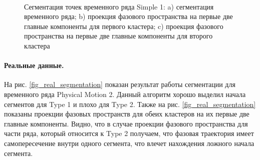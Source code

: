 \begin{figure}[h!t]\center
{}
\\
\caption{Сегментация точек временного ряда Simple 1: 
a) сегментация временного ряда; b) проекция фазового пространства на первые две главные компоненты для первого кластера; c) проекция фазового пространства на первые две главные компоненты для второго кластера}
\label{fig_simple_segmentation}
\end{figure}

\paragraph{Реальные данные.} На рис. \ref{fig_real_segmentation} показан результат работы сегментации для временного ряда Physical Motion 2. 
Данный алгоритм хорошо выделил начала сегментов для Type 1 и плохо для Type 2. 
Также на рис. \ref{fig_real_segmentation} показаны проекции фазовых пространств для обеих кластеров на их первые две главные компоненты. 
Видно, что в случае проекции фазового пространства для части ряда, который относится к Type 2 получаем, что фазовая траектория имеет самопересечение внутри одного сегмента, что влечет нахождения ложного начала сегмента.

